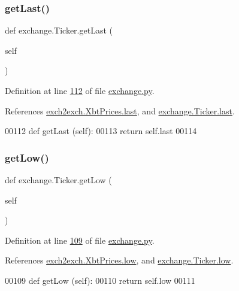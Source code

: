 \subsubsection{\texorpdfstring{get\+Last()}{getLast()}}
{\footnotesize\ttfamily def exchange.\+Ticker.\+get\+Last (\begin{DoxyParamCaption}\item[{}]{self }\end{DoxyParamCaption})}



Definition at line \hyperlink{exchange_8py_source_l00112}{112} of file \hyperlink{exchange_8py_source}{exchange.\+py}.



References \hyperlink{exch2exch_8py_source_l00063}{exch2exch.\+Xbt\+Prices.\+last}, and \hyperlink{exchange_8py_source_l00064}{exchange.\+Ticker.\+last}.


\begin{DoxyCode}
00112     \textcolor{keyword}{def }getLast (self):
00113         \textcolor{keywordflow}{return} self.last
00114     
\end{DoxyCode}
\mbox{\label{classexchange_1_1_ticker_ad398514a81ef5e8e2c71b610766b3d14}} 
\subsubsection{\texorpdfstring{get\+Low()}{getLow()}}
{\footnotesize\ttfamily def exchange.\+Ticker.\+get\+Low (\begin{DoxyParamCaption}\item[{}]{self }\end{DoxyParamCaption})}



Definition at line \hyperlink{exchange_8py_source_l00109}{109} of file \hyperlink{exchange_8py_source}{exchange.\+py}.



References \hyperlink{exch2exch_8py_source_l00062}{exch2exch.\+Xbt\+Prices.\+low}, and \hyperlink{exchange_8py_source_l00063}{exchange.\+Ticker.\+low}.


\begin{DoxyCode}
00109     \textcolor{keyword}{def }getLow (self):
00110         \textcolor{keywordflow}{return} self.low
00111     
\end{DoxyCode}
\mbox{\label{classexchange_1_1_ticker_a309466a5a30813e7feda0f001d633ac9}} 
